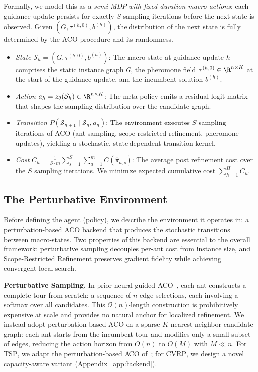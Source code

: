 \documentclass[sigconf,review]{acmart}
\newcommand{\TSP}{\textsc{TSP}}
\newcommand{\CVRP}{\textsc{CVRP}}
\begin{document}
Formally, we model this as a \emph{semi-MDP with fixed-duration macro-actions}: each guidance update persists for exactly $S$ sampling iterations before the next state is observed.
Given $(G, \tau^{(h,0)}, b^{(h)})$, the distribution of the next state is fully determined by the ACO procedure and its randomness.
\begin{itemize}
\item \emph{State} $\mathcal{S}_h = (G, \tau^{(h,0)}, b^{(h)})$: The macro-state at guidance update $h$ comprises the static instance graph $G$, the pheromone field $\tau^{(h,0)} \in \R^{n \times K}$ at the start of the guidance update, and the incumbent solution $b^{(h)}$.

\item \emph{Action} $a_h = z_\theta(\mathcal{S}_h) \in \R^{n \times K}$: The meta-policy emits a residual logit matrix that shapes the sampling distribution over the candidate graph.

\item \emph{Transition} $P(\mathcal{S}_{h+1} \mid \mathcal{S}_h, a_h)$: The environment executes $S$ sampling iterations of ACO (ant sampling, scope-restricted refinement, pheromone updates), yielding a stochastic, state-dependent transition kernel.

\item \emph{Cost} $C_h = \frac{1}{S \cdot m} \sum_{s=1}^{S} \sum_{a=1}^{m} C(\hat{\pi}_{a,s})$: The average post refinement cost over the $S$ sampling iterations.  We minimize expected cumulative cost $\sum_{h=1}^H C_h$.
\end{itemize}

\subsection{The Perturbative Environment}
\label{sec:backend}

Before defining the agent (policy), we describe the environment it operates in: a perturbation-based ACO backend that produces the stochastic transitions between macro-states.
Two properties of this backend are essential to the overall framework: perturbative sampling decouples per-ant cost from instance size, and Scope-Restricted Refinement preserves gradient fidelity while achieving convergent local search.

\smallskip\noindent\textbf{Perturbative Sampling.}
In prior neural-guided ACO~\cite{deepaco,gfacs,gtgaco}, each ant constructs a complete tour from scratch: a sequence of $n$ edge selections, each involving a softmax over all candidates.
This $\mathcal{O}(n)$-length construction is prohibitively expensive at scale and provides no natural anchor for localized refinement.
We instead adopt perturbation-based ACO on a sparse $K$-nearest-neighbor candidate graph: each ant starts from the incumbent tour and modifies only a small subset of edges, reducing the action horizon from $O(n)$ to $O(M)$ with $M \ll n$.
For \TSP{}, we adapt the perturbation-based ACO of~\cite{faco}; for \CVRP{}, we design a novel capacity-aware variant (Appendix~\ref{app:backend}).
\end{document}
